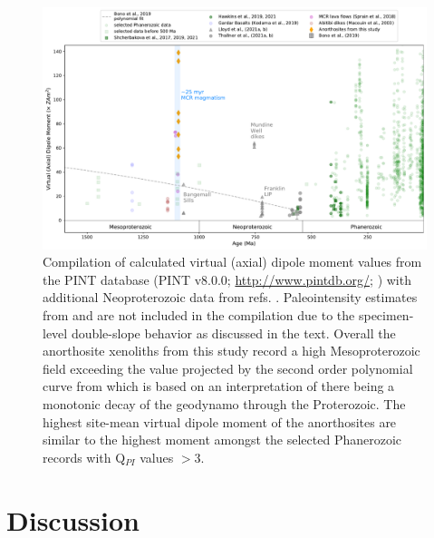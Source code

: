 \documentclass[9pt,twocolumn,twoside,lineno]{pnas-new}
\begin{document}
\begin{figure}[h!]
\noindent\includegraphics[width=17.8 cm]{PINT_compilation.pdf}
\centering
\caption{\footnotesize{Compilation of calculated virtual (axial) dipole moment values from the PINT database (PINT v8.0.0; \url{http://www.pintdb.org/};  \citealp{Bono2021a}) with additional Neoproterozoic data from refs. \citealp{Lloyd2021a, Lloyd2021b, Thallner2021a, Thallner2021b}. Paleointensity estimates from \cite{Pesonen1983a} and \cite{Kulakov2013a} are not included in the compilation due to the specimen-level double-slope behavior as discussed in the text. Overall the anorthosite xenoliths from this study record a high Mesoproterozoic field exceeding the value projected by the second order polynomial curve from \cite{Bono2019a} which is based on an interpretation of there being a monotonic decay of the geodynamo through the Proterozoic. The highest site-mean virtual dipole moment of the anorthosites are similar to the highest moment amongst the selected Phanerozoic records with Q$_{PI}$ values $>$3. }}
\label{fig:PINT_compilation}
\end{figure}

\section*{Discussion}

\end{document}
